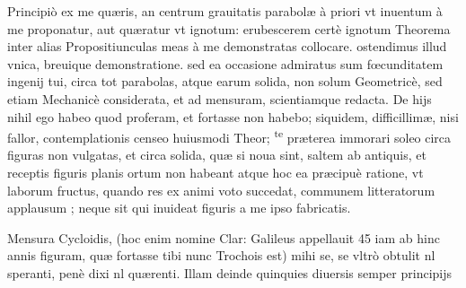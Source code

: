 \documentclass[11pt,a4paper]{article}
\begin{document}
Principiò ex me quæris, an centrum grauitatis parabolæ à priori vt inuentum à me proponatur, aut quæratur vt ignotum: erubescerem certè ignotum Theorema inter alias Propositiunculas meas à me demonstratas collocare. ostendimus illud vnica, breuique demonstratione. sed ea occasione admiratus sum fœcunditatem ingenij tui, circa tot parabolas, atque earum solida, non solum Geometricè, sed etiam Mechanicè considerata, et ad mensuram, scientiamque redacta. De hijs nihil ego habeo quod proferam, et fortasse non habebo; siquidem, difficillimæ, nisi fallor, contemplationis censeo huiusmodi Theor; \textsuperscript{te} præterea immorari  soleo circa figuras non vulgatas, et circa solida, quæ si noua sint, saltem ab antiquis, et receptis figuris planis ortum non habeant atque hoc ea præcipuè ratione, vt laborum fructus, quando res ex animi voto succedat, communem litteratorum applausum ; neque sit qui inuideat figuris a me ipso fabricatis.

Mensura Cycloidis, (hoc enim nomine Clar: Galileus appellauit 45 iam ab hinc annis figuram, quæ fortasse tibi nunc Trochois est) mihi se, se vltrò obtulit nl speranti, penè dixi nl quærenti. Illam deinde quinquies diuersis semper principijs
\end{document}
